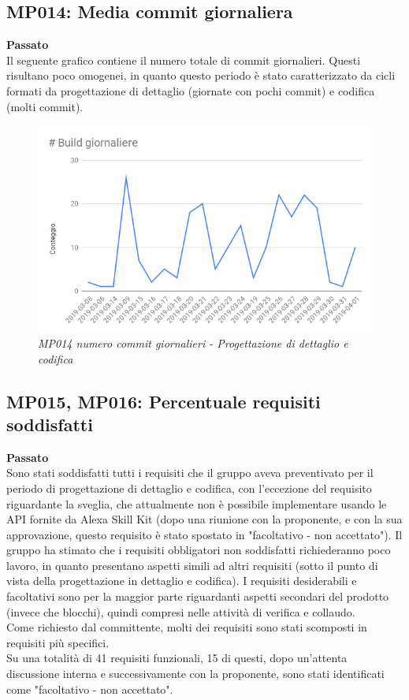 \subsection{MP014: Media commit giornaliera}
\textbf{Passato}\\
Il seguente grafico contiene il numero totale di commit giornalieri. Questi risultano poco omogenei, in quanto questo periodo è stato caratterizzato da cicli formati da progettazione di dettaglio (giornate con pochi commit) e codifica (molti commit).\\
\begin{figure} [H]
    \centering
	\includegraphics[scale=0.4]{./images/buildsPDC.png}
    \caption{\textit{MP014 numero commit giornalieri - Progettazione di dettaglio e codifica}}
\end{figure}

\subsection{MP015, MP016: Percentuale requisiti soddisfatti}
\textbf{Passato}\\
Sono stati soddisfatti tutti i requisiti che il gruppo aveva preventivato per il periodo di progettazione di dettaglio e codifica, con l'eccezione del requisito riguardante la sveglia, che attualmente non è possibile implementare usando le API fornite da Alexa Skill Kit (dopo una riunione con la proponente, e con la sua approvazione,  questo requisito è stato spostato in "facoltativo - non accettato").
Il gruppo ha stimato che i requisiti obbligatori non soddisfatti richiederanno poco lavoro, in quanto presentano aspetti simili ad altri requisiti (sotto il punto di vista della progettazione in dettaglio e codifica). I requisiti desiderabili e facoltativi sono per la maggior parte riguardanti aspetti secondari del prodotto (invece che blocchi), quindi compresi nelle attività di verifica e collaudo.\\
Come richiesto dal committente, molti dei requisiti sono stati scomposti in requisiti più specifici.\\
Su una totalità di 41 requisiti funzionali, 15 di questi, dopo un'attenta discussione interna e successivamente con la proponente, sono stati identificati come "facoltativo - non accettato".

